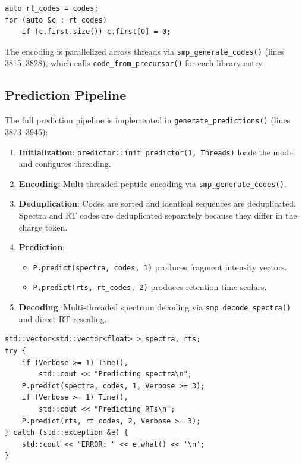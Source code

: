 \documentclass[11pt,a4paper]{article}
\begin{document}
\begin{lstlisting}[caption={Charge zeroing for RT codes (from generate\_predictions, line 3905)}]
auto rt_codes = codes;
for (auto &c : rt_codes)
    if (c.first.size()) c.first[0] = 0;
\end{lstlisting}

The encoding is parallelized across threads via \texttt{smp\_generate\_codes()} (lines 3815--3828), which calls \texttt{code\_from\_precursor()} for each library entry.

\subsection{Prediction Pipeline}

The full prediction pipeline is implemented in \texttt{generate\_predictions()} (lines 3873--3945):

\begin{enumerate}
    \item \textbf{Initialization}: \texttt{predictor::init\_predictor(1, Threads)} loads the model and configures threading.
    \item \textbf{Encoding}: Multi-threaded peptide encoding via \texttt{smp\_generate\_codes()}.
    \item \textbf{Deduplication}: Codes are sorted and identical sequences are deduplicated. Spectra and RT codes are deduplicated separately because they differ in the charge token.
    \item \textbf{Prediction}:
    \begin{itemize}
        \item \texttt{P.predict(spectra, codes, 1)} produces fragment intensity vectors.
        \item \texttt{P.predict(rts, rt\_codes, 2)} produces retention time scalars.
    \end{itemize}
    \item \textbf{Decoding}: Multi-threaded spectrum decoding via \texttt{smp\_decode\_spectra()} and direct RT rescaling.
\end{enumerate}

\begin{lstlisting}[caption={Core prediction calls (lines 3920--3930)}]
std::vector<std::vector<float> > spectra, rts;
try {
    if (Verbose >= 1) Time(),
        std::cout << "Predicting spectra\n";
    P.predict(spectra, codes, 1, Verbose >= 3);
    if (Verbose >= 1) Time(),
        std::cout << "Predicting RTs\n";
    P.predict(rts, rt_codes, 2, Verbose >= 3);
} catch (std::exception &e) {
    std::cout << "ERROR: " << e.what() << '\n';
}
\end{lstlisting}
\end{document}
